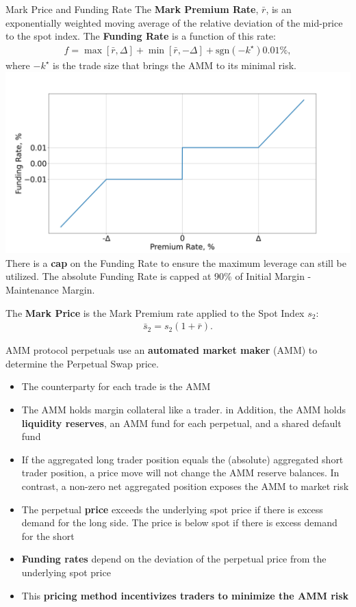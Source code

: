 \documentclass[10pt,a4paper]{article}
\begin{document}
\begin{multicols}{3}
\begin{textbox}{Mark Price and Funding Rate}
The \textbf{Mark Premium Rate}, $\bar{r}$, is an exponentially weighted moving average of the
relative deviation of the mid-price to the spot index.
The  \textbf{Funding Rate} is a function of this rate:
\begin{align}
    f= \max\left[ \bar{r}, \Delta\right] +
    \min\left[ \bar{r}, -\Delta\right] +
    \text{sgn}(-k^\star)  0.01\%,
\end{align}
where $-k^\star$ is the trade size that brings the AMM to its minimal risk.
\includegraphics[width=\textwidth]{fundingrate.png}\\
There is a \textbf{cap} on the Funding Rate to ensure the maximum 
leverage can still be utilized. The absolute Funding Rate is capped at 90\% of 
Initial Margin - Maintenance Margin.

The \textbf{Mark Price} is the Mark Premium rate applied to the Spot Index $s_2$:
\begin{align}
    \bar{s}_2 = s_2 (1+\bar{r}).
\end{align}
\end{textbox}

\begin{textbox}{AMM}
protocol perpetuals use an \textbf{automated market maker} (AMM) to determine
the Perpetual Swap price. 
\begin{itemize}
\item The counterparty for each trade is the AMM
\item The AMM holds margin collateral like a trader. in Addition,
the AMM holds \textbf{liquidity reserves}, an AMM fund for each perpetual, and
a shared default fund
\item If the aggregated long trader position equals the (absolute) aggregated short
trader position, a price move will not change the AMM reserve balances. 
In contrast, a non-zero net aggregated position exposes the AMM to market risk
\item The perpetual \textbf{price} exceeds the underlying spot price if there is excess
demand for the long side. The price is below spot if there is excess demand for the short
\item \textbf{Funding rates} depend on the deviation of the perpetual price from the 
underlying spot price
\item This \textbf{pricing method
incentivizes traders to minimize the AMM risk}
\end{itemize}
\end{textbox}


\end{multicols}
\end{document}
